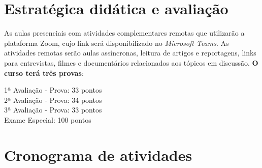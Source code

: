 \documentclass[
]{book}
\theoremstyle{definition}
\theoremstyle{definition}
\theoremstyle{definition}
\theoremstyle{definition}
\theoremstyle{remark}
\begin{document}
\hypertarget{estratuxe9gica-diduxe1tica-e-avaliauxe7uxe3o}{%
\section{Estratégica didática e avaliação}\label{estratuxe9gica-diduxe1tica-e-avaliauxe7uxe3o}}

As aulas presenciais com atividades complementares remotas que utilizarão a plataforma Zoom, cujo link será disponibilizado no \emph{Microsoft Teams}. As atividades remotas serão aulas assíncronas, leitura de artigos e reportagens, links para entrevistas, filmes e documentários relacionados aos tópicos em discussão. \textbf{O curso terá três provas}:

1ª Avaliação - Prova: 33 pontos\\
2ª Avaliação - Prova: 34 pontos\\
3ª Avaliação - Prova: 33 pontos\\
Exame Especial: 100 pontos

\hypertarget{cronograma-de-atividades}{%
\section{Cronograma de atividades}\label{cronograma-de-atividades}}
\end{document}
